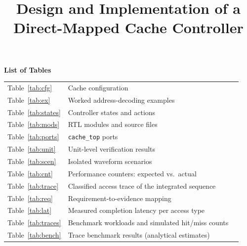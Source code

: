 \documentclass[conference,a4paper]{IEEEtran}
\begin{document}
\vspace{0.2cm}
\noindent\textbf{List of Tables}\\[2pt]
\begin{tabular}{@{}p{1.6cm}p{11.6cm}r@{}}
Table~\ref{tab:cfg} & Cache configuration & \pageref{tab:cfg}\\
Table~\ref{tab:ex} & Worked address-decoding examples & \pageref{tab:ex}\\
Table~\ref{tab:states} & Controller states and actions & \pageref{tab:states}\\
Table~\ref{tab:mods} & RTL modules and source files & \pageref{tab:mods}\\
Table~\ref{tab:ports} & \texttt{cache\_top} ports & \pageref{tab:ports}\\
Table~\ref{tab:unit} & Unit-level verification results & \pageref{tab:unit}\\
Table~\ref{tab:scen} & Isolated waveform scenarios & \pageref{tab:scen}\\
Table~\ref{tab:cnt} & Performance counters: expected vs.\ actual & \pageref{tab:cnt}\\
Table~\ref{tab:trace} & Classified access trace of the integrated sequence & \pageref{tab:trace}\\
Table~\ref{tab:req} & Requirement-to-evidence mapping & \pageref{tab:req}\\
Table~\ref{tab:lat} & Measured completion latency per access type & \pageref{tab:lat}\\
Table~\ref{tab:traces} & Benchmark workloads and simulated hit/miss counts & \pageref{tab:traces}\\
Table~\ref{tab:bench} & Trace benchmark results (analytical estimates) & \pageref{tab:bench}\\
\end{tabular}
\normalsize
\clearpage

\twocolumn
\title{Design and Implementation of a Direct-Mapped Cache Controller}
\author{%
\and
{}
\and
{}
\and
{}
\and
{}
\and
{}
}
\maketitle
\end{document}
